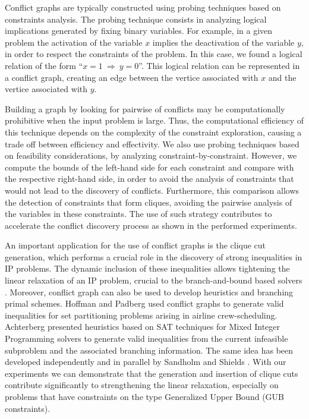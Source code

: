 \documentclass{endm}
\begin{document}
Conflict graphs are typically constructed using probing techniques \cite{Borndorfer1998} based on constraints analysis. The probing technique consists in analyzing logical implications generated by fixing binary variables. For example, in a given problem the activation of the variable $x$ implies the deactivation of the variable $y$, in order to respect the constraints of the problem. In this case, we found a logical relation of the form ``$x = 1 \ \Rightarrow \ y = 0$''. This logical relation can be represented in a conflict graph, creating an edge between the vertice associated with $x$ and the vertice associated with $y$.

Building a graph by looking for pairwise of conflicts may be computationally prohibitive when the input problem is large. Thus, the computational efficiency of this technique depends on the complexity of the constraint exploration, causing a trade off between efficiency and effectivity. We also use probing techniques based on feasibility considerations, by analyzing constraint-by-constraint. However, we compute the bounds of the left-hand side for each constraint and compare with the respective right-hand side, in order to avoid the analysis of constraints that would not lead to the discovery of conflicts. Furthermore, this comparison allows the detection of constraints that form cliques, avoiding the pairwise analysis of the variables in these constraints. The use of such strategy contributes to accelerate the conflict discovery process as shown in the performed experiments.

An important application for the use of conflict graphs is the clique cut generation, which performs a crucial role in the discovery of strong inequalities \cite{chvatal} in IP problems. The dynamic inclusion of these inequalities allows tightening the linear relaxation of an IP problem, crucial to the branch-and-bound based solvers \cite{atamturk}. Moreover, conflict graph can also be used to develop heuristics and branching primal schemes. Hoffman and Padberg \cite{hoffman} used conflict graphs to generate valid inequalities for set partitioning problems arising in airline crew-scheduling. Achterberg \cite{achterberg} presented heuristics based on SAT techniques for Mixed Integer Programming solvers to generate valid inequalities from the current infeasible subproblem and the associated branching information. The same idea has been developed independently and in parallel by Sandholm and Shields \cite{sandholm}. With our experiments we can demonstrate that the generation and insertion of clique cuts contribute significantly to strengthening the linear relaxation, especially on problems that have constraints on the type Generalized Upper Bound (GUB constraints).
\end{document}
